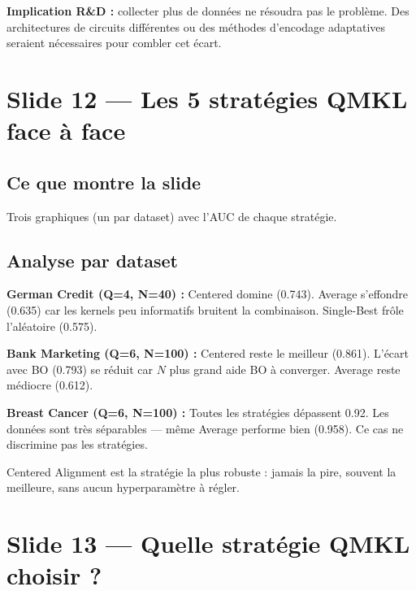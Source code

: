 \documentclass[12pt, a4paper]{article}
\begin{document}
\begin{attention}
\textbf{Implication R\&D :} collecter plus de données ne résoudra pas le problème.
Des architectures de circuits différentes ou des méthodes d'encodage adaptatives
seraient nécessaires pour combler cet écart.
\end{attention}

\section{Slide 12 — Les 5 stratégies QMKL face à face}

\subsection*{Ce que montre la slide}

Trois graphiques (un par dataset) avec l'AUC de chaque stratégie.

\subsection*{Analyse par dataset}

\textbf{German Credit (Q=4, N=40) :}
Centered domine (0.743). Average s'effondre (0.635) car les kernels peu informatifs
bruitent la combinaison. Single-Best frôle l'aléatoire (0.575).

\textbf{Bank Marketing (Q=6, N=100) :}
Centered reste le meilleur (0.861). L'écart avec BO (0.793) se réduit
car $N$ plus grand aide BO à converger. Average reste médiocre (0.612).

\textbf{Breast Cancer (Q=6, N=100) :}
Toutes les stratégies dépassent 0.92. Les données sont très séparables —
même Average performe bien (0.958). Ce cas ne discrimine pas les stratégies.

\begin{retenir}
Centered Alignment est la stratégie la plus robuste : jamais la pire,
souvent la meilleure, sans aucun hyperparamètre à régler.
\end{retenir}

\section{Slide 13 — Quelle stratégie QMKL choisir ?}
\end{document}
